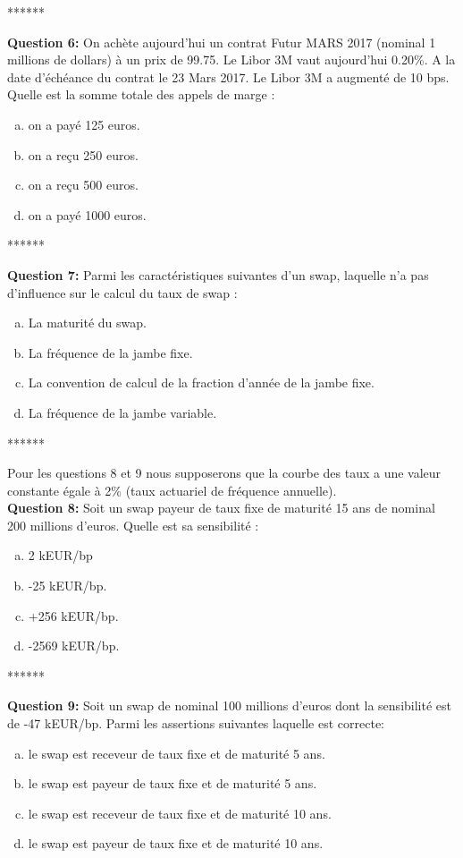 \documentclass{article}
\newcommand{\indentitem}{\setlength\itemindent{25pt}}
\begin{document}
\smallskip
\centerline{******}
\smallskip
\textbf{Question 6:}
On achète aujourd’hui un contrat Futur MARS 2017  (nominal 1 millions de dollars) à un prix de 99.75. Le Libor 3M vaut aujourd’hui 0.20\%. A la date d’échéance du contrat le 23 Mars 2017. Le Libor 3M a augmenté de 10 bps. Quelle est la somme totale des appels de marge :
\begin{enumerate}[a)]
\indentitem \item on a payé 125 euros.
\indentitem \item on a reçu 250 euros.
\indentitem \item on a reçu 500 euros.
\indentitem \item on a payé 1000 euros.
\end{enumerate}
\newpage
\smallskip
\centerline{******}
\smallskip
\textbf{Question 7:} Parmi les caractéristiques suivantes d’un swap, laquelle n’a pas d’influence sur le calcul du taux de swap :
\begin{enumerate}[a)]
\indentitem \item La maturité du swap.
\indentitem \item La fréquence de la jambe fixe.
\indentitem \item La convention de calcul de la fraction d’année de la jambe fixe.
\indentitem \item La fréquence de la jambe variable.
\end{enumerate}
\smallskip
\centerline{******}
\smallskip
Pour les questions 8 et 9 nous supposerons que la courbe des taux a une valeur constante égale à 2\% (taux actuariel de fréquence annuelle).
\smallskip\\
\textbf{Question 8:} Soit un swap payeur de taux fixe de maturité 15 ans de nominal 200 millions d’euros. Quelle est sa sensibilité :
\begin{enumerate}[a)]
\indentitem \item 2 kEUR/bp
\indentitem \item -25 kEUR/bp.
\indentitem \item +256 kEUR/bp.
\indentitem \item -2569 kEUR/bp.
\end{enumerate}
\smallskip
\centerline{******}
\smallskip
\textbf{Question 9:}
Soit un swap de nominal 100 millions d’euros dont la sensibilité est de -47 kEUR/bp. Parmi les assertions suivantes laquelle est correcte:
\begin{enumerate}[a)]
\indentitem \item le swap est receveur de taux fixe et de maturité 5 ans.
\indentitem \item le swap est payeur de taux fixe et de maturité 5 ans.
\indentitem \item le swap est receveur de taux fixe et de maturité 10 ans.
\indentitem \item le swap est payeur de taux fixe et de maturité 10 ans.
\end{enumerate}
\end{document}
